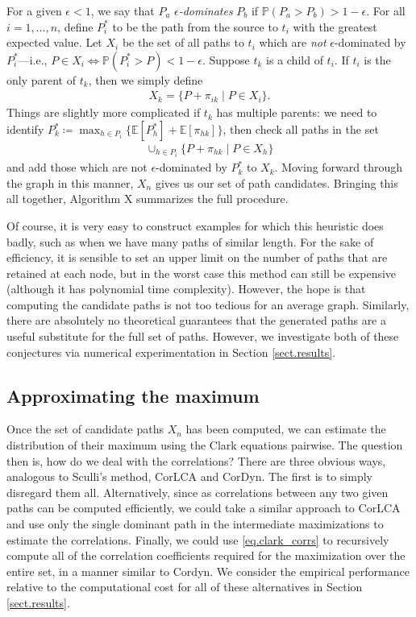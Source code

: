 \documentclass[12pt]{article}
\def\P{\mathbb{P}}
\def\E{\mathbb{E}}
\begin{document}
For a given $\epsilon < 1$, we say that $P_a$ {\em $\epsilon$-dominates} $P_b$ if $\P(P_a > P_b) > 1 - \epsilon$. For all $i = 1, \dots, n$, define $P_i^*$ to be the path from the source to $t_i$ with the greatest expected value. Let $X_i$ be the set of all paths to $t_i$ which are {\em not} $\epsilon$-dominated by $P_i^*$---i.e., $P \in X_i \iff \P(P_i^* > P) < 1- \epsilon$. Suppose $t_k$ is a child of $t_i$. If $t_i$ is the only parent of $t_k$, then we simply define
\begin{align*}
  X_k = \{P + \pi_{ik} \mid P \in X_i\}.
\end{align*}
Things are slightly more complicated if $t_k$ has multiple parents: we need to identify $P_k^* \coloneqq \max_{h \in P_i} \{ \E[P_h^*] + \E[\pi_{hk}] \}$, then check all paths in the set  
\begin{align*}
  \cup_{h \in P_i}\{P + \pi_{hk} \mid P \in X_h \}
\end{align*}
and add those which are not $\epsilon$-dominated by $P_k^*$ to $X_k$. Moving forward through the graph in this manner, $X_n$ gives us our set of path candidates. Bringing this all together, Algorithm X summarizes the full procedure.    
 
Of course, it is very easy to construct examples for which this heuristic does badly, such as when we have many paths of similar length. For the sake of efficiency, it is sensible to set an upper limit on the number of paths that are retained at each node, but in the worst case this method can still be expensive (although it has polynomial time complexity). However, the hope is that computing the candidate paths is not too tedious for an average graph. Similarly, there are absolutely no theoretical guarantees that the generated paths are a useful substitute for the full set of paths. However, we investigate both of these conjectures via numerical experimentation in Section \ref{sect.results}.

\subsection{Approximating the maximum}
\label{subsect.approx_max}

Once the set of candidate paths $X_n$ has been computed, we can estimate the distribution of their maximum using the Clark equations pairwise. The question then is, how do we deal with the correlations? There are three obvious ways, analogous to Sculli's method, CorLCA and CorDyn. The first is to simply disregard them all. Alternatively, since as correlations between any two given paths can be computed efficiently, we could take a similar approach to CorLCA and use only the single dominant path in the intermediate maximizations to estimate the correlations. Finally, we could use \eqref{eq.clark_corrs} to recursively compute all of the correlation coefficients required for the maximization over the entire set, in a manner similar to Cordyn. We consider the empirical performance relative to the computational cost for all of these alternatives in Section \ref{sect.results}.
\end{document}

